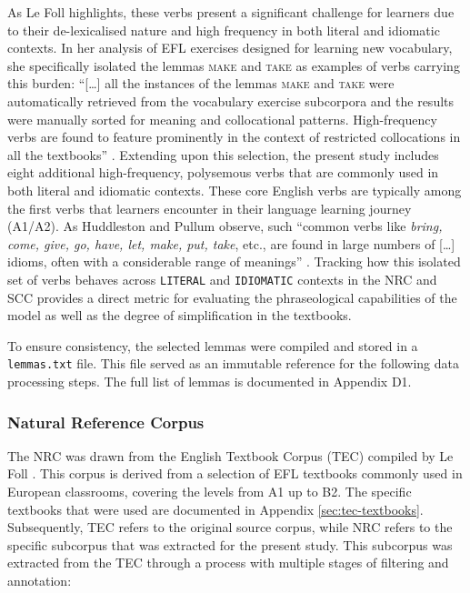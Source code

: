 \documentclass[11pt,a4paper]{article}
\begin{document}
As Le Foll \parencite*{leFoll2024} highlights, these verbs present a significant challenge for learners due to their de-lexicalised nature and high frequency in both literal and idiomatic contexts. In her analysis of EFL exercises designed for learning new vocabulary, she specifically isolated the lemmas \textsc{make} and \textsc{take} as examples of verbs carrying this burden: ``[\ldots] all the instances of the lemmas \textsc{make} and \textsc{take} were automatically retrieved from the vocabulary exercise subcorpora and the results were manually sorted for meaning and collocational patterns. High-frequency verbs are found to feature prominently in the context of restricted collocations in all the textbooks'' \parencite[46]{leFoll2024}. Extending upon this selection, the present study includes eight additional high-frequency, polysemous verbs that are commonly used in both literal and idiomatic contexts. These core English verbs are typically among the first verbs that learners encounter in their language learning journey (A1/A2). As Huddleston and Pullum observe, such ``common verbs like \textit{bring, come, give, go, have, let, make, put, take}, etc., are found in large numbers of [\ldots] idioms, often with a considerable range of meanings'' \parencite*[284]{huddlestonPullumCambridge2002}. Tracking how this isolated set of verbs behaves across \texttt{LITERAL} and \texttt{IDIOMATIC} contexts in the NRC and SCC provides a direct metric for evaluating the phraseological capabilities of the model as well as the degree of simplification in the textbooks.

To ensure consistency, the selected lemmas were compiled and stored in a \texttt{lemmas.txt} file. This file served as an immutable reference for the following data processing steps. The full list of lemmas is documented in Appendix D1.

\subsubsection{Natural Reference Corpus}\label{subsubsec:nrc}

The NRC was drawn from the English Textbook Corpus (TEC) compiled by Le Foll \parencite*{leFoll2021a}. This corpus is derived from a selection of EFL textbooks commonly used in European classrooms, covering the levels from A1 up to B2. The specific textbooks that were used are documented in Appendix \ref{sec:tec-textbooks}. Subsequently, TEC refers to the original source corpus, while NRC refers to the specific subcorpus that was extracted for the present study. This subcorpus was extracted from the TEC through a process with multiple stages of filtering and annotation:
\end{document}
